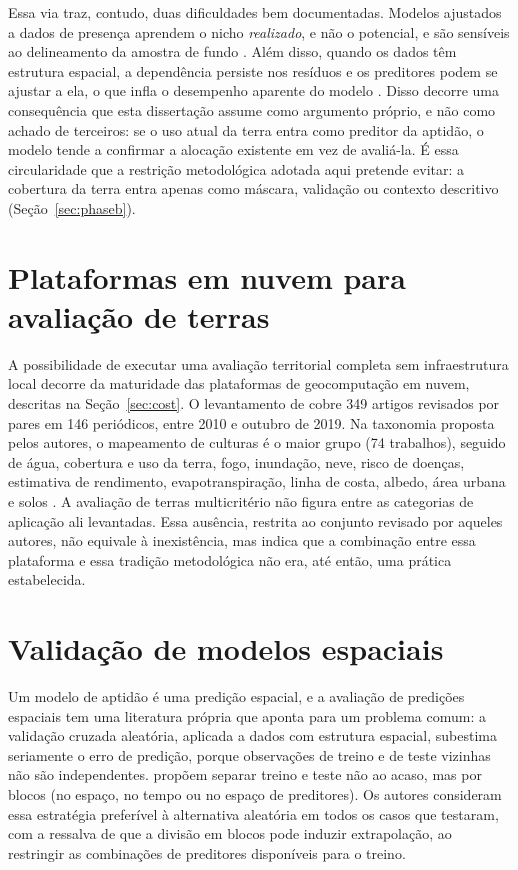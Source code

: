 Essa via traz, contudo, duas dificuldades bem documentadas. Modelos ajustados a dados de presença
aprendem o nicho \emph{realizado}, e não o potencial, e são sensíveis ao delineamento da amostra de fundo
\citep{valavi_modelling_2021}. Além disso, quando os dados têm estrutura espacial, a dependência
persiste nos resíduos e os preditores podem se ajustar a ela, o que infla o desempenho aparente do modelo
\citep[p.~913]{roberts_crossvalidation_2017}. Disso decorre uma consequência que esta dissertação
assume como argumento próprio, e não como achado de terceiros: se o uso atual da terra entra como
preditor da aptidão, o modelo tende a confirmar a alocação existente em vez de avaliá-la. É essa
circularidade que a restrição metodológica adotada aqui pretende evitar: a cobertura da terra entra
apenas como máscara, validação ou contexto descritivo (Seção~\ref{sec:phaseb}).

\section{Plataformas em nuvem para avaliação de terras}\label{sec:sota-plataforma}

A possibilidade de executar uma avaliação territorial completa sem infraestrutura local decorre da
maturidade das plataformas de geocomputação em nuvem, descritas na Seção~\ref{sec:cost}. O levantamento
de \citet[p.~152]{tamiminia_google_2020} cobre 349 artigos revisados por pares em 146 periódicos, entre
2010 e outubro de 2019. Na taxonomia proposta pelos autores, o mapeamento de culturas é o maior grupo
(74 trabalhos), seguido de água, cobertura e uso da terra, fogo, inundação, neve, risco de doenças,
estimativa de rendimento, evapotranspiração, linha de costa, albedo, área urbana e solos
\citep[Tabela~1, pp.~154--155]{tamiminia_google_2020}. A avaliação de terras multicritério não figura
entre as categorias de aplicação ali levantadas. Essa ausência, restrita ao conjunto revisado por aqueles
autores, não equivale à inexistência, mas indica que a combinação entre essa plataforma e essa tradição
metodológica não era, até então, uma prática estabelecida.

\section{Validação de modelos espaciais}\label{sec:sota-validacao}

Um modelo de aptidão é uma predição espacial, e a avaliação de predições espaciais tem uma literatura
própria que aponta para um problema comum: a validação cruzada aleatória, aplicada a dados com
estrutura espacial, subestima seriamente o erro de predição, porque observações de treino e de teste
vizinhas não são independentes. \citet[p.~913]{roberts_crossvalidation_2017} propõem separar treino e
teste não ao acaso, mas por blocos (no espaço, no tempo ou no espaço de preditores). Os autores
consideram essa estratégia preferível à alternativa aleatória em todos os casos que testaram, com a
ressalva de que a divisão em blocos pode induzir extrapolação, ao restringir as combinações de
preditores disponíveis para o treino.

